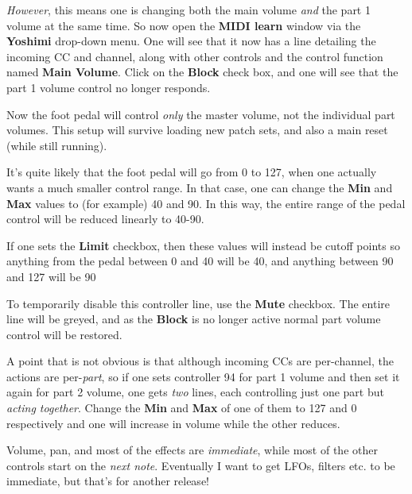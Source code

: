    \textsl{However}, this means one is changing both the main volume
   \textsl{and} the part 1 volume at the same time.  So now open the
   \textbf{MIDI learn} window via the \textbf{Yoshimi} drop-down menu. One will
   see that it now has a line detailing the incoming CC and channel, along with
   other controls and the control function named \textbf{Main Volume}.  Click
   on the \textbf{Block} check box, and one will see that the part 1 volume
   control no longer responds.

   Now the foot pedal will control \textsl{only} the master volume, not the
   individual part volumes. This setup will survive loading new patch sets, and
   also a main reset (while still running).

   It's quite likely that the foot pedal will go from 0 to 127, when one actually
   wants a much smaller control range.  In that case, one can change the
   \textbf{Min} and \textbf{Max}
   values to (for example) 40 and 90.
   In this way, the entire range of the pedal control will be reduced linearly to
   40-90.

   If one sets the \textbf{Limit} checkbox, then these values will instead be
   cutoff points so anything from the pedal between 0 and 40 will be 40, and
   anything between 90 and 127 will be 90

   To temporarily disable this controller line, use the \textbf{Mute} checkbox.
   The entire line will be greyed, and as the \textbf{Block} is no longer
   active normal part volume control will be restored.

   A point that is not obvious is that although incoming CCs are per-channel,
   the actions are per-\textsl{part}, so if one sets controller 94 for part 1
   volume and then set it again for part 2 volume, one gets \textsl{two} lines,
   each controlling just one part but \textsl{acting together}.  Change the
   \textbf{Min} and \textbf{Max} of one of them to 127 and 0 respectively and
   one will increase in volume while the other reduces.

   Volume, pan, and most of the effects are \textsl{immediate}, while most of
   the other controls start on the \textsl{next note}.  Eventually I want to
   get LFOs, filters etc. to be immediate, but that's for another release!

